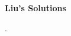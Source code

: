 \documentclass[11pt,a4paper]{ctexart}
\begin{document}
\begin{center}
\Large\textbf{Liu's Solutions}
\end{center}
.\\
\end{document}
